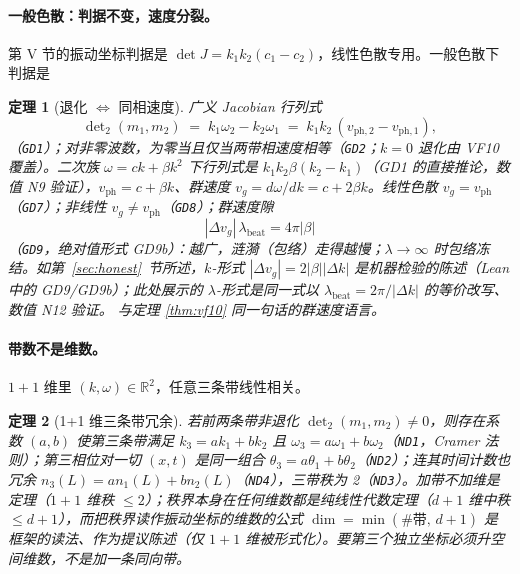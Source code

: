 \documentclass[aps,prd,preprint,superscriptaddress,amsmath,amssymb]{revtex4-2}
\newtheorem{theorem}{定理}[section]
\begin{document}
\paragraph{一般色散：判据不变，速度分裂。}
第 V 节的振动坐标判据是 $\det J=k_1k_2(c_1-c_2)$，线性色散专用。一般色散下判据是

\begin{theorem}[退化 $\iff$ 同相速度]
\label{thm:gd}
广义 Jacobian 行列式
\begin{equation}
\det\nolimits_2(m_1,m_2)
\;=\; k_1\omega_2-k_2\omega_1
\;=\; k_1k_2\,(v_{{\mathrm{ph}},2}-v_{{\mathrm{ph}},1}),
\label{eq:det2}
\end{equation}
（\texttt{GD1}）；对非零波数，为零当且仅当两带相速度相等（\texttt{GD2}；$k=0$ 退化由 VF10 覆盖）。二次族 $\omega=ck+\beta k^2$ 下行列式是 $k_1k_2\beta(k_2-k_1)$（GD1 的直接推论，数值 N9 验证），$v_{\mathrm{ph}}=c+\beta k$、群速度 $v_g=d\omega/dk=c+2\beta k$。线性色散 $v_g=v_{\mathrm{ph}}$（\texttt{GD7}）；非线性 $v_g\ne v_{\mathrm{ph}}$（\texttt{GD8}）；群速度隙
\begin{equation}
|\Delta v_g|\,\lambda_{\mathrm{beat}}=4\pi|\beta|
\label{eq:gvgap}
\end{equation}
（\texttt{GD9}，绝对值形式 GD9b）：\emph{越广，涟漪（包络）走得越慢；$\lambda\to\infty$ 时包络冻结。如第~\ref{sec:honest}~节所述，$k$-形式 $|\Delta v_g|=2|\beta||\Delta k|$ 是机器检验的陈述（Lean 中的 GD9/GD9b）；此处展示的 $\lambda$-形式是同一式以 $\lambda_{\mathrm{beat}}=2\pi/|\Delta k|$ 的等价改写、数值 N12 验证。} 与定理 \ref{thm:vf10} 同一句话的群速度语言。
\end{theorem}

\paragraph{带数不是维数。}
$1+1$ 维里 $(k,\omega)\in\mathbb{R}^2$，任意三条带线性相关。

\begin{theorem}[1+1 维三条带冗余]
\label{thm:nd}
若前两条带非退化 $\det\nolimits_2(m_1,m_2)\ne0$，则存在系数 $(a,b)$ 使第三条带满足 $k_3=ak_1+bk_2$ 且 $\omega_3=a\omega_1+b\omega_2$（\texttt{ND1}，Cramer 法则）；第三相位对一切 $(x,t)$ 是同一组合 $\theta_3=a\theta_1+b\theta_2$（\texttt{ND2}）；连其时间计数也冗余 $n_3(L)=an_1(L)+bn_2(L)$（\texttt{ND4}），三带秩为 2（\texttt{ND3}）。\emph{加带不加维}是定理（$1+1$ 维秩 $\le2$）；秩界本身在任何维数都是纯线性代数定理（$d+1$ 维中秩 $\le d+1$），而把秩界读作\emph{振动坐标的维数}的公式 $\dim=\min(\#\text{带},\,d+1)$ 是框架的读法、作为提议陈述（仅 $1+1$ 维被形式化）。要第三个独立坐标必须升空间维数，不是加一条同向带。
\end{theorem}
\end{document}
